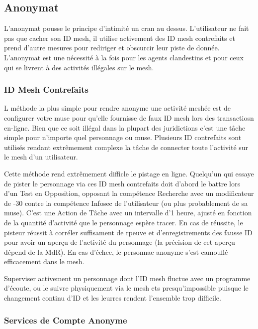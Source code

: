 \subsection{Anonymat} 

L'anonymat pousse le principe d'intimité un cran au dessus. L'utilisateur ne fait pas que cacher son ID mesh, il utilise activement des ID mesh contrefaits et prend d'autre mesures pour rediriger et obscurcir leur piste de donnée. L'anonymat est une nécessité à la fois pour les agents clandestins et pour ceux qui se livrent à des activités illégales sur le mesh. 

\subsubsection{ID Mesh Contrefaits} 

L méthode la plus simple pour rendre anonyme une activité meshée est de configurer votre muse pour qu'elle fournisse de faux ID mesh lors des transactiosn en-ligne. Bien que ce soit illégal dans la plupart des juridictions c'est une tâche simple pour n'importe quel personnage ou muse. Plusieurs ID contrefaits sont utilisés rendant extrêmement complexe la tâche de connecter toute l'activité sur le mesh d'un utilisateur. 

Cette méthode rend extrêmement difficle le pistage en ligne. Quelqu'un qui essaye de pister le personnage via ces ID mesh contrefaits doit d'abord le battre lors d'un Test en Opposition, opposant la compétence Recherche avec un modificateur de -30 contre la compétence Infosec de l'utilisateur (ou plus probablement de sa muse). C'est une Action de Tâche avec un intervalle d'1 heure, ajusté en fonction de la quantité d'activité que le personnage espère tracer. En cas de réussite, le pisteur réussit à corréler suffisament de rpeuve et d'enregistrements des fausse ID pour avoir un aperçu de l'activité du personnage (la précision de cet aperçu dépend de la MdR). En cas d'échec, le personnae anonyme s'est camouflé efficacement dans le mesh. 

Superviser activement un personnage dont l'ID mesh fluctue avec un programme d'écoute, ou le suivre physiquement via le mesh ets presqu'impossible puisque le changement continu d'ID et les leurres rendent l'ensemble trop difficile. 

\subsubsection{Services de Compte Anonyme} 

